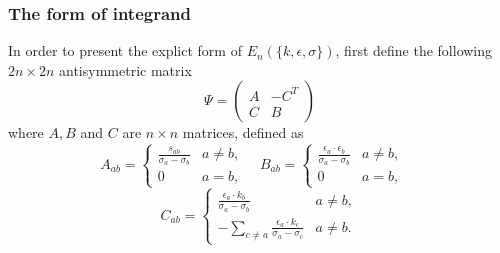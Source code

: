 \documentclass{beamer}
\begin{document}
\begin{frame}
    \frametitle{The form of integrand}
    In order to present the explict form of $E_n(\{k,\epsilon,\sigma\})$, first define the following $2n\times2n$ antisymmetric matrix 
    \begin{equation*}
        \Psi=\begin{pmatrix}
            A & -C^T \\
            C & B 
        \end{pmatrix}
    \end{equation*}
    where $A,B$ and $C$ are $n\times n$ matrices, defined as 
    \begin{equation*}
        A_{ab}=\begin{cases}\frac{s_{ab}}{\sigma_a-\sigma_b}&a\neq b,\\0&a=b,\end{cases} \quad 
        B_{ab}=\begin{cases}\frac{\epsilon_a \cdot \epsilon_b}{\sigma_a-\sigma_b}&a\neq b,\\0&a=b, \end{cases} \quad
    \end{equation*}
    \begin{equation*}
        C_{ab}=\begin{cases}\frac{\epsilon_a\cdot k_b}{\sigma_a-\sigma_b}&a\neq b,\\-\sum_{c\neq a}\frac{\epsilon_a\cdot k_c}{\sigma_a-\sigma_c}&a\neq b.\end{cases}
    \end{equation*}
\end{frame}
\end{document}
